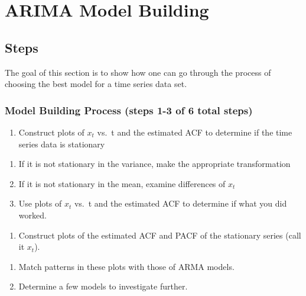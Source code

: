 \documentclass[
]{book}
\providecommand{\tightlist}{%
  \setlength{\itemsep}{0pt}\setlength{\parskip}{0pt}}
\theoremstyle{definition}
\theoremstyle{definition}
\theoremstyle{definition}
\theoremstyle{definition}
\theoremstyle{remark}
\begin{document}
\hypertarget{arima-model-building}{%
\chapter{ARIMA Model Building}\label{arima-model-building}}

\hypertarget{steps}{%
\section{Steps}\label{steps}}

The goal of this section is to show how one can go through the process of choosing the best model for a time series data set.

\hypertarget{model-building-process-steps-1-3-of-6-total-steps}{%
\subsection{Model Building Process (steps 1-3 of 6 total steps)}\label{model-building-process-steps-1-3-of-6-total-steps}}

\begin{enumerate}
\def\labelenumi{\arabic{enumi}.}
\tightlist
\item
  Construct plots of \(x_t\) vs.~t and the estimated ACF to determine if the time series data is stationary
\end{enumerate}

\begin{enumerate}
\def\labelenumi{\alph{enumi})}
\tightlist
\item
  If it is not stationary in the variance, make the appropriate transformation
\item
  If it is not stationary in the mean, examine differences of \(x_t\)
\item
  Use plots of \(x_t\) vs.~t and the estimated ACF to determine if what you did worked.
\end{enumerate}

\begin{enumerate}
\def\labelenumi{\arabic{enumi}.}
\setcounter{enumi}{1}
\tightlist
\item
  Construct plots of the estimated ACF and PACF of the stationary series (call it \(x_t\)).
\end{enumerate}

\begin{enumerate}
\def\labelenumi{\alph{enumi})}
\tightlist
\item
  Match patterns in these plots with those of ARMA models.\\
\item
  Determine a few models to investigate further.
\end{enumerate}
\end{document}

